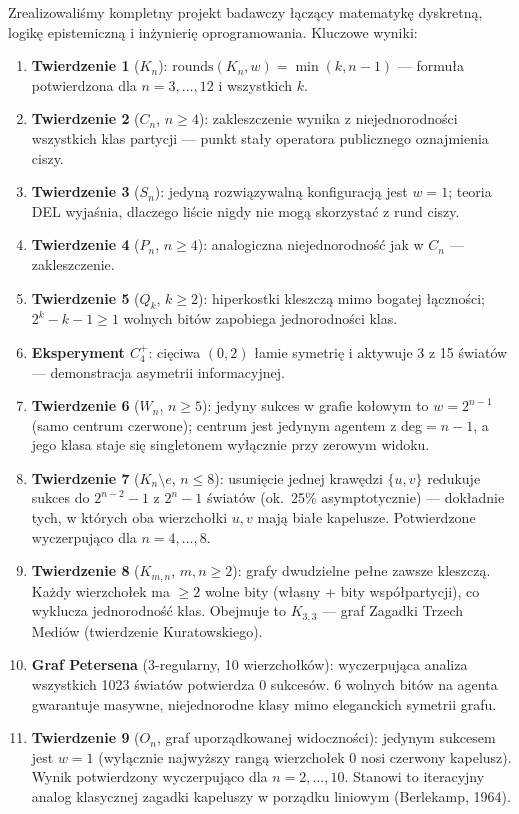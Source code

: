 \documentclass[12pt,a4paper]{article}
\theoremstyle{plain}
\theoremstyle{definition}
\theoremstyle{remark}
\newcommand{\rounds}{\mathrm{rounds}}
\begin{document}
Zrealizowaliśmy kompletny projekt badawczy łączący matematykę dyskretną, logikę epistemiczną i inżynierię oprogramowania. Kluczowe wyniki:

\begin{enumerate}
  \item \textbf{Twierdzenie 1} ($K_n$): $\rounds(K_n,w) = \min(k,n-1)$ — formuła potwierdzona dla $n=3,\ldots,12$ i wszystkich $k$.
  \item \textbf{Twierdzenie 2} ($C_n$, $n \ge 4$): zakleszczenie wynika z niejednorodności wszystkich klas partycji — punkt stały operatora publicznego oznajmienia ciszy.
  \item \textbf{Twierdzenie 3} ($S_n$): jedyną rozwiązywalną konfiguracją jest $w=1$; teoria DEL wyjaśnia, dlaczego liście nigdy nie mogą skorzystać z rund ciszy.
  \item \textbf{Twierdzenie 4} ($P_n$, $n \ge 4$): analogiczna niejednorodność jak w $C_n$ — zakleszczenie.
  \item \textbf{Twierdzenie 5} ($Q_k$, $k \ge 2$): hiperkostki kleszczą mimo bogatej łączności; $2^k-k-1 \ge 1$ wolnych bitów zapobiega jednorodności klas.
  \item \textbf{Eksperyment $C_4^+$}: cięciwa $(0,2)$ łamie symetrię i aktywuje 3 z 15 światów — demonstracja asymetrii informacyjnej.
  \item \textbf{Twierdzenie 6} ($W_n$, $n \ge 5$): jedyny sukces w grafie kołowym to $w = 2^{n-1}$ (samo centrum czerwone); centrum jest jedynym agentem z deg$=n-1$, a jego klasa staje się singletonem wyłącznie przy zerowym widoku.
  \item \textbf{Twierdzenie 7} ($K_n \setminus e$, $n \le 8$): usunięcie jednej krawędzi $\{u,v\}$ redukuje sukces do $2^{n-2}{-}1$ z $2^n{-}1$ światów (ok.\ 25\% asymptotycznie) — dokładnie tych, w których oba wierzchołki $u, v$ mają białe kapelusze. Potwierdzone wyczerpująco dla $n = 4,\ldots,8$.
  \item \textbf{Twierdzenie 8} ($K_{m,n}$, $m,n \ge 2$): grafy dwudzielne pełne zawsze kleszczą. Każdy wierzchołek ma $\ge 2$ wolne bity (własny + bity współpartycji), co wyklucza jednorodność klas. Obejmuje to $K_{3,3}$ — graf Zagadki Trzech Mediów (twierdzenie Kuratowskiego).
  \item \textbf{Graf Petersena} (3-regularny, 10 wierzchołków): wyczerpująca analiza wszystkich 1023 światów potwierdza 0 sukcesów. 6 wolnych bitów na agenta gwarantuje masywne, niejednorodne klasy mimo eleganckich symetrii grafu.
  \item \textbf{Twierdzenie 9} ($O_n$, graf uporządkowanej widoczności): jedynym sukcesem jest $w=1$ (wyłącznie najwyższy rangą wierzchołek 0 nosi czerwony kapelusz). Wynik potwierdzony wyczerpująco dla $n=2,\ldots,10$. Stanowi to iteracyjny analog klasycznej zagadki kapeluszy w porządku liniowym (Berlekamp, 1964).

\end{enumerate}
\end{document}
